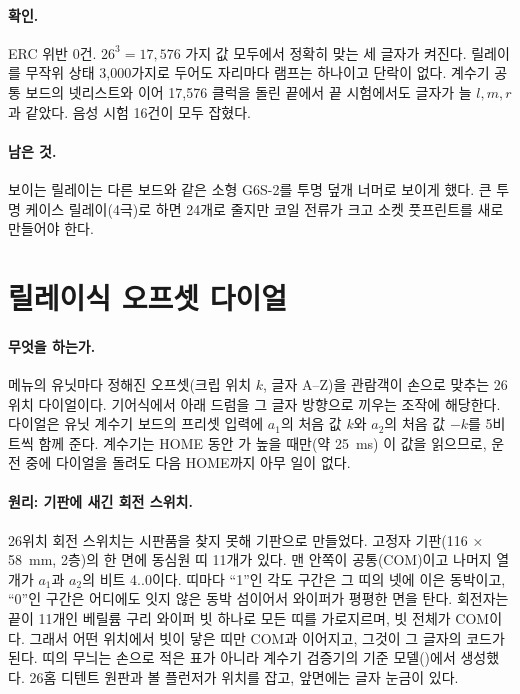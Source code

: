 \paragraph{확인.} ERC 위반 0건. $26^3 = 17{,}576$ 가지  값 모두에서 정확히 맞는 세 글자가 켜진다. 릴레이를
무작위 상태 3,000가지로 두어도 자리마다 램프는 하나이고 단락이 없다. 계수기 공통 보드의 넷리스트와 이어 17,576 클럭을
돌린 끝에서 끝 시험에서도 글자가 늘 $l, m, r$과 같았다. 음성 시험 16건이 모두 잡혔다.

\paragraph{남은 것.} 보이는 릴레이는 다른 보드와 같은 소형 G6S-2를 투명 덮개 너머로 보이게 했다. 큰 투명 케이스
릴레이(4극)로 하면 24개로 줄지만 코일 전류가 크고 소켓 풋프린트를 새로 만들어야 한다.


\section{릴레이식 오프셋 다이얼}\label{sch:relay-offset-dial}

\paragraph{무엇을 하는가.} 메뉴의 유닛마다 정해진 오프셋(크립 위치 $k$, 글자 A--Z)을 관람객이 손으로 맞추는 26위치
다이얼이다. 기어식에서 아래 드럼을 그 글자 방향으로 끼우는 조작에 해당한다. 다이얼은 유닛 계수기 보드의 프리셋 입력에
$a_1$의 처음 값 $k$와 $a_2$의 처음 값 $-k$를 5비트씩 함께 준다. 계수기는 HOME 동안 가 높을 때만(약 25~ms)
이 값을 읽으므로, 운전 중에 다이얼을 돌려도 다음 HOME까지 아무 일이 없다.

\paragraph{원리: 기판에 새긴 회전 스위치.} 26위치 회전 스위치는 시판품을 찾지 못해 기판으로 만들었다. 고정자 기판(116 ×
58~mm, 2층)의 한 면에 동심원 띠 11개가 있다. 맨 안쪽이 공통(COM)이고 나머지 열 개가 $a_1$과 $a_2$의 비트 4..0이다. 띠마다
``1''인 각도 구간은 그 띠의 넷에 이은 동박이고, ``0''인 구간은 어디에도 잇지 않은 동박 섬이어서 와이퍼가 평평한 면을
탄다. 회전자는 끝이 11개인 베릴륨 구리 와이퍼 빗 하나로 모든 띠를 가로지르며, 빗 전체가 COM이다. 그래서 어떤
위치에서 빗이 닿은 띠만 COM과 이어지고, 그것이 그 글자의 코드가 된다. 띠의 무늬는 손으로 적은 표가 아니라 계수기
검증기의 기준 모델()에서 생성했다. 26홈 디텐트 원판과 볼 플런저가 위치를 잡고, 앞면에는 글자 눈금이
있다.


